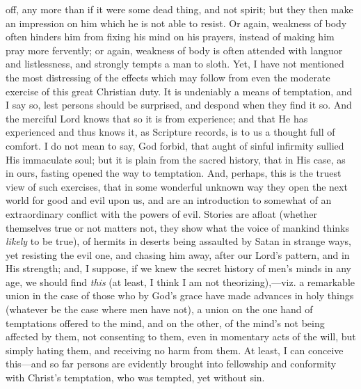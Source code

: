 off, any more than if it were some dead thing, and not spirit; but
they then make an impression on him which he is not able to resist. Or
again, weakness of body often hinders him from fixing his mind on his
prayers, instead of making him pray more fervently; or again, weakness
of body is often attended with languor and listlessness, and strongly
tempts a man to sloth. Yet, I have not mentioned the most distressing
of the effects which may follow from even the moderate exercise of
this great Christian duty. It is undeniably a means of temptation, and
I say so, lest persons should be surprised, and despond when they find
it so. And the merciful Lord knows that so it is from experience; and
that He has experienced and thus knows it, as Scripture records, is to
us a thought full of comfort. I do not mean to say, God forbid, that
aught of sinful infirmity sullied His immaculate soul; but it is plain
from the sacred history, that in His case, as in ours, fasting opened
the way to temptation. And, perhaps, this is the truest view of such
exercises, that in some wonderful unknown way they open the next world
for good and evil upon us, and are an introduction to somewhat of an
extraordinary conflict with the powers of evil. Stories are afloat
(whether themselves true or not matters not, they show what the voice
of mankind thinks \emph{likely} to be true), of hermits in deserts
being assaulted by Satan in strange ways, yet resisting the evil one,
and chasing him away, after our Lord's pattern, and in His strength;
and, I suppose, if we knew the secret history of men's minds in any
age, we should find \emph{this} (at least, I think I am not
theorizing),—viz. a remarkable union in the case of those who by
God's grace have made advances in holy things (whatever be the case
where men have not), a union on the one hand of temptations offered to
the mind, and on the other, of the mind's not being affected by them,
not consenting to them, even in momentary acts of the will, but simply
hating them, and receiving no harm from them. At least, I can conceive
this—and so far persons are evidently brought into fellowship and
conformity with Christ's temptation, who was tempted, yet without sin.

